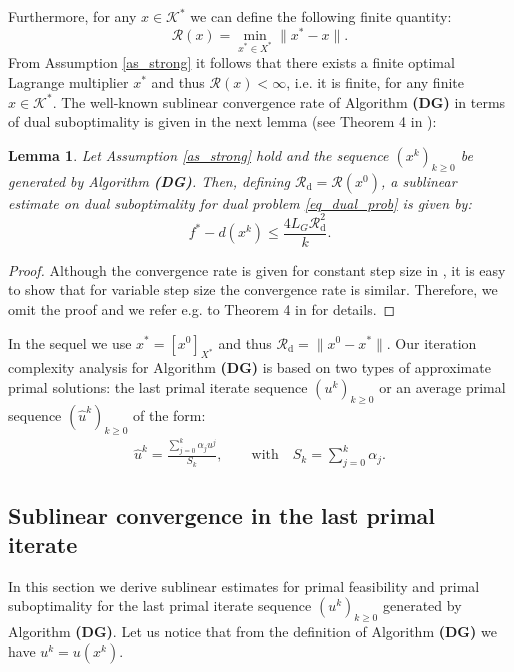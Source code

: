 \documentclass{gOMS2e}
\theoremstyle{plain}
\newtheorem{lemma}[theorem]{Lemma}
\theoremstyle{definition}
\theoremstyle{remark}
\begin{document}
\noindent Furthermore, for any $x \in {{\mathcal{K}}^*}$ we can define the
following finite quantity:
\begin{equation}
\label{rd} \mathcal{R} (x) =  \min\limits_{x^* \in X^*} \|x^* - x\|.
\end{equation}
From  Assumption \ref{as_strong} it follows that  there exists a
finite optimal Lagrange multiplier $x^*$ and thus $\mathcal{R} (x) <
\infty$, i.e. it  is finite, for any finite $x \in {{\mathcal{K}}^*}$. The
well-known sublinear convergence rate  of Algorithm {\bf (DG)} in
terms of dual suboptimality is given in the next lemma (see Theorem
4 in \cite{Nes:12_comp}):

\begin{lemma} \cite{Nes:12_comp}
\label{th_sublin} Let Assumption \ref{as_strong} hold and the
sequence $\left(x^k\right)_{k\geq 0}$ be generated by Algorithm {\bf
(DG)}. Then,  defining $\mathcal{R}_\text{d}  = \mathcal{R}(x^0)$, a sublinear
estimate on dual suboptimality for  dual problem
\eqref{eq_dual_prob} is given by:
\begin{equation}
\label{bound_dual_optim_adg} f^* - d({x}^{k}) \leq \frac{4 L_G
\mathcal{R}_\text{d}^2}{k}.
\end{equation}
\end{lemma}
\begin{proof}
Although the convergence rate is  given for constant step size in
\cite{Nes:12_comp}, it is easy  to show that  for variable step size
the convergence rate is similar. Therefore, we omit the proof and we
refer e.g. to  Theorem 4 in \cite{Nes:12_comp} for details.
\end{proof}

\noindent In the sequel  we use $x^* = [x^0]_{X^*}$ and thus
$\mathcal{R}_\text{d} = \| x^0 - x^*\|$. Our iteration complexity
analysis for Algorithm {\bf (DG)} is based on two types of
approximate primal solutions:  the last primal iterate sequence
$(u^k)_{k \geq 0} $ or an average primal sequence $(\hat u^k)_{k
\geq 0}$ of the form:
\begin{align}
\label{av_dg} \hat u^k =\frac{ \sum_{j=0}^k \alpha_j u^j}{S_k},
\qquad \text{with} \quad S_k=\sum_{j=0}^k \alpha_j.
\end{align}

\subsection{Sublinear convergence in the last primal iterate}
\label{sublinear_first} \noindent In this section we derive
sublinear estimates for  primal feasibility  and primal
suboptimality for the last primal iterate sequence $(u^k)_{k \geq
0}$ generated by  Algorithm \textbf{(DG)}. Let us notice that from
the definition of Algorithm \textbf{(DG)} we have $u^k = u(x^k)$.
\end{document}
